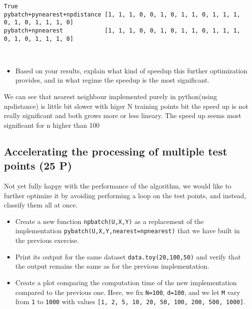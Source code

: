 \documentclass[11pt]{article}
\providecommand{\tightlist}{%
      \setlength{\itemsep}{0pt}\setlength{\parskip}{0pt}}
\begin{document}
    \begin{Verbatim}[commandchars=\\\{\}]
True
pybatch+pynearest+npdistance [1, 1, 1, 0, 0, 1, 0, 1, 1, 0, 1, 1, 1, 0, 1, 0, 1, 1, 1, 0]
pybatch+npnearest            [1, 1, 1, 0, 0, 1, 0, 1, 1, 0, 1, 1, 1, 0, 1, 0, 1, 1, 1, 0]

    \end{Verbatim}

    \begin{center}
    \end{center}
    { \hspace*{\fill} \\}
    
    \begin{itemize}
\tightlist
\item
  Based on your results, explain what kind of speedup this further
  optimization provides, and in what regime the speedup is the most
  significant.
\end{itemize}
We can see that nearest neighbour implemented purely in python(using npdistance) is little bit slower with higer N training points bit the speed up is not really significant and both grows more or less lineary. 
The speed up seems most significant for n higher than 100
    \subsection{Accelerating the processing of multiple test points (25
P)}\label{accelerating-the-processing-of-multiple-test-points-25-p}

Not yet fully happy with the performance of the algorithm, we would like
to further optimize it by avoiding performing a loop on the test points,
and instead, classify them all at once.

\begin{itemize}
\item
  Create a new function \texttt{npbatch(U,X,Y)} as a replacement of the
  implementation \texttt{pybatch(U,X,Y,nearest=npnearest)} that we have
  built in the previous exercise.
\item
  Print its output for the same dataset \texttt{data.toy(20,100,50)} and
  verify that the output remains the same as for the previous
  implementation.
\item
  Create a plot comparing the computation time of the new implementation
  compared to the previous one. Here, we fix \texttt{N=100},
  \texttt{d=100}, and we let \texttt{M} vary from \texttt{1} to
  \texttt{1000} with values
  \texttt{{[}1,\ 2,\ 5,\ 10,\ 20,\ 50,\ 100,\ 200,\ 500,\ 1000{]}}.
\end{itemize}
\end{document}
